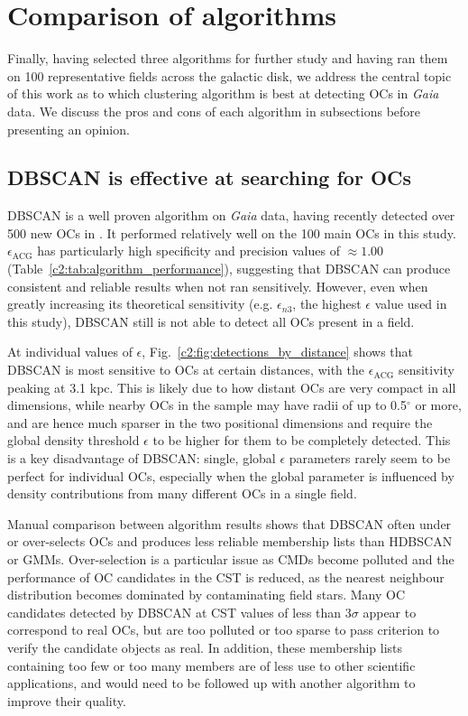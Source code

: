 \section{Comparison of algorithms}\label{c2:sec:discussion}

Finally, having selected three algorithms for further study and having ran them on 100 representative fields across the galactic disk, we address the central topic of this work as to which clustering algorithm is best at detecting OCs in \emph{Gaia} data. We discuss the pros and cons of each algorithm in subsections before presenting an opinion.


\subsection{DBSCAN is effective at searching for OCs}

DBSCAN is a well proven algorithm on \emph{Gaia} data, having recently detected over 500 new OCs in \cite{castro-ginard_hunting_2020}. It performed relatively well on the 100 main OCs in this study. $\epsilon_\text{ACG}$ has particularly high specificity and precision values of $\approx1.00$ (Table~\ref{c2:tab:algorithm_performance}), suggesting that DBSCAN can produce consistent and reliable results when not ran sensitively. However, even when greatly increasing its theoretical sensitivity (e.g. $\epsilon_{n3}$, the highest $\epsilon$ value used in this study), DBSCAN still is not able to detect all OCs present in a field.

At individual values of $\epsilon$, Fig.~\ref{c2:fig:detections_by_distance} shows that DBSCAN is most sensitive to OCs at certain distances, with the $\epsilon_\text{ACG}$ sensitivity peaking at 3.1 kpc. This is likely due to how distant OCs are very compact in all dimensions, while nearby OCs in the sample may have radii of up to 0.5$^\circ$ or more, and are hence much sparser in the two positional dimensions and require the global density threshold $\epsilon$ to be higher for them to be completely detected. This is a key disadvantage of DBSCAN: single, global $\epsilon$ parameters rarely seem to be perfect for individual OCs, especially when the global parameter is influenced by density contributions from many different OCs in a single field. 

Manual comparison between algorithm results shows that DBSCAN often under or over-selects OCs and produces less reliable membership lists than HDBSCAN or GMMs. Over-selection is a particular issue as CMDs become polluted and the performance of OC candidates in the CST is reduced, as the nearest neighbour distribution becomes dominated by contaminating field stars. Many OC candidates detected by DBSCAN at CST values of less than 3$\sigma$ appear to correspond to real OCs, but are too polluted or too sparse to pass criterion to verify the candidate objects as real. In addition, these membership lists containing too few or too many members are of less use to other scientific applications, and would need to be followed up with another algorithm to improve their quality.

